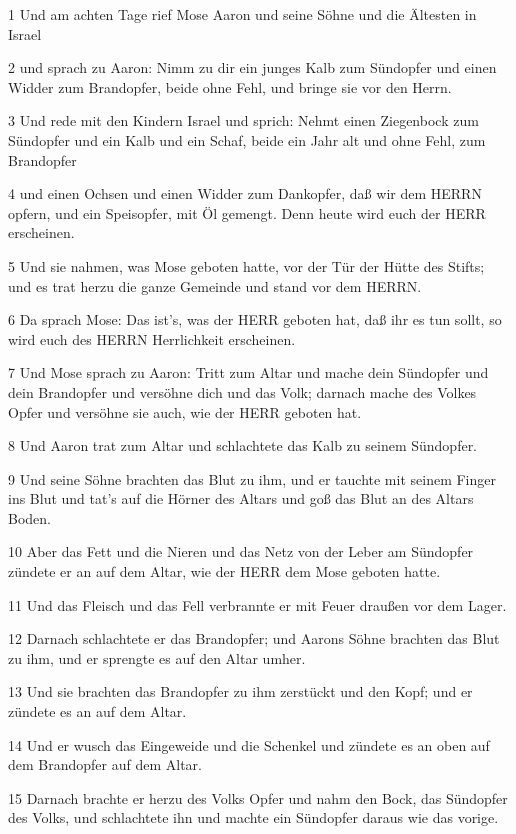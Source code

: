 \par 1 Und am achten Tage rief Mose Aaron und seine Söhne und die Ältesten in Israel
\par 2 und sprach zu Aaron: Nimm zu dir ein junges Kalb zum Sündopfer und einen Widder zum Brandopfer, beide ohne Fehl, und bringe sie vor den Herrn.
\par 3 Und rede mit den Kindern Israel und sprich: Nehmt einen Ziegenbock zum Sündopfer und ein Kalb und ein Schaf, beide ein Jahr alt und ohne Fehl, zum Brandopfer
\par 4 und einen Ochsen und einen Widder zum Dankopfer, daß wir dem HERRN opfern, und ein Speisopfer, mit Öl gemengt. Denn heute wird euch der HERR erscheinen.
\par 5 Und sie nahmen, was Mose geboten hatte, vor der Tür der Hütte des Stifts; und es trat herzu die ganze Gemeinde und stand vor dem HERRN.
\par 6 Da sprach Mose: Das ist's, was der HERR geboten hat, daß ihr es tun sollt, so wird euch des HERRN Herrlichkeit erscheinen.
\par 7 Und Mose sprach zu Aaron: Tritt zum Altar und mache dein Sündopfer und dein Brandopfer und versöhne dich und das Volk; darnach mache des Volkes Opfer und versöhne sie auch, wie der HERR geboten hat.
\par 8 Und Aaron trat zum Altar und schlachtete das Kalb zu seinem Sündopfer.
\par 9 Und seine Söhne brachten das Blut zu ihm, und er tauchte mit seinem Finger ins Blut und tat's auf die Hörner des Altars und goß das Blut an des Altars Boden.
\par 10 Aber das Fett und die Nieren und das Netz von der Leber am Sündopfer zündete er an auf dem Altar, wie der HERR dem Mose geboten hatte.
\par 11 Und das Fleisch und das Fell verbrannte er mit Feuer draußen vor dem Lager.
\par 12 Darnach schlachtete er das Brandopfer; und Aarons Söhne brachten das Blut zu ihm, und er sprengte es auf den Altar umher.
\par 13 Und sie brachten das Brandopfer zu ihm zerstückt und den Kopf; und er zündete es an auf dem Altar.
\par 14 Und er wusch das Eingeweide und die Schenkel und zündete es an oben auf dem Brandopfer auf dem Altar.
\par 15 Darnach brachte er herzu des Volks Opfer und nahm den Bock, das Sündopfer des Volks, und schlachtete ihn und machte ein Sündopfer daraus wie das vorige.
